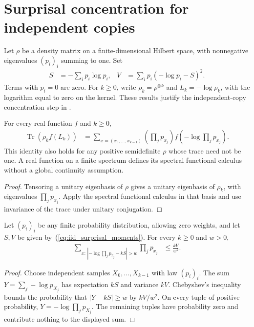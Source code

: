 \section{Surprisal concentration for independent copies}
\label{sec:iid_surprisal}

Let $\rho$ be a density matrix on a finite-dimensional Hilbert space, with
nonnegative eigenvalues $(p_i)_i$ summing to one. Set
\begin{align}
 S&=-\sum_i p_i\log p_i,
 &V&=\sum_i p_i(-\log p_i-S)^2.
 \label{eq:iid_surprisal_moments}
\end{align}
Terms with $p_i=0$ are zero. For $k\ge0$, write
$\rho_k=\rho^{\otimes k}$ and $L_k=-\log\rho_k$, with the logarithm equal
to zero on the kernel. These results justify the independent-copy
concentration step in \cite[Section~7]{OpenAI2026AreaLaw}.

\begin{theorem}
\label{thm:iid_surprisal_spectral_distribution}
\leanok
For every real function $f$ and $k\ge0$,
\begin{align}
 \operatorname{Tr}(\rho_k f(L_k))
  &=\sum_{x=(x_0,\ldots,x_{k-1})}
       \left(\prod_jp_{x_j}\right)
       f\left(-\log\prod_jp_{x_j}\right).
 \label{eq:iid_surprisal_spectral_distribution}
\end{align}
This identity also holds for any positive semidefinite $\rho$ whose trace
need not be one. A real function on a finite spectrum defines its spectral
functional calculus without a global continuity assumption.
\end{theorem}
\begin{proof}
\leanok
Tensoring a unitary eigenbasis of $\rho$ gives a unitary eigenbasis of
$\rho_k$, with eigenvalues $\prod_jp_{x_j}$. Apply the spectral functional
calculus in that basis and use invariance of the trace under unitary
conjugation.
\end{proof}

\begin{theorem}
\label{thm:iid_surprisal_chebyshev}
\leanok
Let $(p_i)_i$ be any finite probability distribution, allowing zero weights,
and let $S,V$ be given by~(\ref{eq:iid_surprisal_moments}). For every $k\ge0$
and $w>0$,
\begin{align}
 \sum_{x:\,| -\log\prod_jp_{x_j}-kS |>w}\prod_jp_{x_j}
   &\le \frac{kV}{w^2}.
 \label{eq:iid_surprisal_chebyshev}
\end{align}
\end{theorem}
\begin{proof}
\leanok
Choose independent samples $X_0,\ldots,X_{k-1}$ with law $(p_i)_i$.
The sum $Y=\sum_j-\log p_{X_j}$ has expectation $kS$ and variance $kV$.
Chebyshev's inequality bounds the probability that $|Y-kS|\ge w$ by
$kV/w^2$. On every tuple of positive probability,
$Y=-\log\prod_jp_{X_j}$. The remaining tuples have probability zero and
contribute nothing to the displayed sum.
\end{proof}

